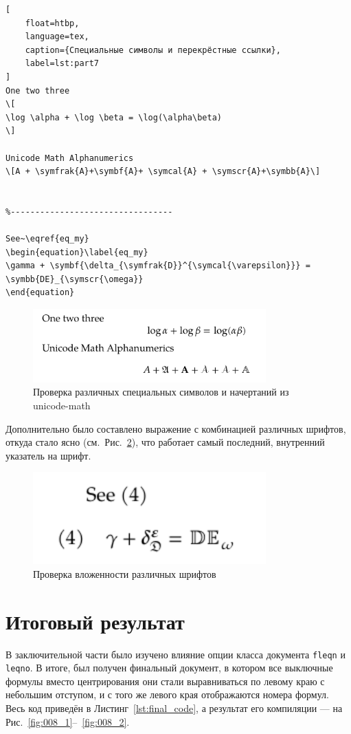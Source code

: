 \documentclass[a4paper, 12pt]{article}
\renewcommand{\figurename}{Рис.}
\renewcommand{\lstlistingname}{Листинг}
\begin{document}
\begin{lstlisting}[
    float=htbp, 
    language=tex,
    caption={Специальные символы и перекрёстные ссылки}, 
    label=lst:part7
]
One two three
\[
\log \alpha + \log \beta = \log(\alpha\beta)
\]

Unicode Math Alphanumerics
\[A + \symfrak{A}+\symbf{A}+ \symcal{A} + \symscr{A}+\symbb{A}\]


%---------------------------------

See~\eqref{eq_my}
\begin{equation}\label{eq_my}
\gamma + \symbf{\delta_{\symfrak{D}}^{\symcal{\varepsilon}}} = \symbb{DE}_{\symscr{\omega}}
\end{equation}
\end{lstlisting}

\begin{figure}[H]
    \centering
    \includegraphics[width=0.8\textwidth]{image/6.png}
    \caption{Проверка различных специальных символов и начертаний из unicode-math}
    \label{fig:006}
\end{figure}

Дополнительно было составлено выражение с комбинацией различных шрифтов, откуда стало ясно (см.~\figurename~\ref{fig:007}), что работает самый последний, внутренний указатель на шрифт.

\begin{figure}[H]
    \centering
    \includegraphics[width=0.8\textwidth]{image/7.png}
    \caption{Проверка вложенности различных шрифтов}
    \label{fig:007}
\end{figure}

\section{Итоговый результат}
В заключительной части было изучено влияние опции класса документа \texttt{fleqn} и \texttt{leqno}. В итоге, был получен финальный документ, в котором все выключные формулы вместо центрирования они стали выравниваться по левому краю с небольшим отступом, и с того же левого края отображаются номера формул. Весь код приведён в \lstlistingname~\ref{lst:final_code}, а результат его компиляции --- на \figurename~\ref{fig:008_1}--~\ref{fig:008_2}.
\end{document}

